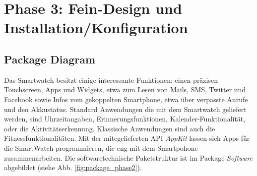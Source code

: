 \chapter{Phase 3: Fein-Design und Installation/Konfiguration}

\section{Package Diagram}
Das Smartwatch besitzt einige interessante Funktionen: einen präzisen Touchscreen, Apps und Widgets, etwa zum Lesen von Mails, SMS, Twitter und Facebook sowie Infos vom gekoppelten Smartphone, etwa über verpasste Anrufe und den Akkustatus.
Standard Anwendungen die mit dem Smartwatch geliefert werden, sind Uhrzeitangaben, Erinnerungsfunktionen, Kalender-Funktionalität, oder die Aktivitätserkennung.
Klassische Anwendungen sind auch die Fitnessfunktionalitäten.
Mit der mitegelieferten API \textit{AppKit} lassen sich Apps für die SmartWatch programmieren, die eng mit dem Smartpohone zusammenarbeiten.
Die softwaretechnische Paketstruktur ist im Package \textit{Software} abgebildet (siehe Abb. \ref{fig:package_phase2}).







